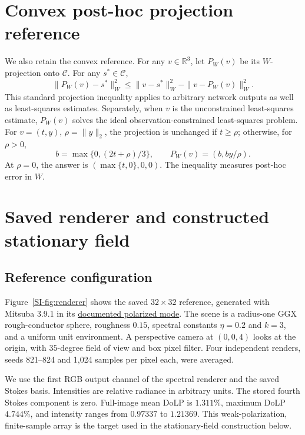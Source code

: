 \section{Convex post-hoc projection reference}
We also retain the convex reference. For any $v\in\mathbb R^3$, let $P_W(v)$ be its $W$-projection onto $\mathcal C$. For any $s^*\in\mathcal C$,
\begin{equation}
 \|P_W(v)-s^*\|_W^2\leq\|v-s^*\|_W^2-\|v-P_W(v)\|_W^2.
 \label{SI-eq:projbound}
\end{equation}
This standard projection inequality \cite{supp-prox} applies to arbitrary network outputs as well as least-squares estimates. Separately, when $v$ is the unconstrained least-squares estimate, $P_W(v)$ solves the ideal observation-constrained least-squares problem. For $v=(t,y)$, $\rho=\|y\|_2$, the projection is unchanged if $t\geq\rho$; otherwise, for $\rho>0$,
\begin{equation}
 b=\max\{0,(2t+\rho)/3\},\qquad P_W(v)=(b,by/\rho).
 \label{SI-eq:weightedprojection}
\end{equation}
At $\rho=0$, the answer is $(\max\{t,0\},0,0)$. The inequality measures post-hoc error in $W$.


\section{Saved renderer and constructed stationary field}
\subsection{Reference configuration}
Figure~\ref{SI-fig:renderer} shows the saved $32\times32$ reference, generated with Mitsuba 3.9.1 in its \href{https://mitsuba.readthedocs.io/en/latest/src/rendering/polarized_rendering.html}{documented polarized mode}. The scene is a radius-one GGX rough-conductor sphere, roughness $0.15$, spectral constants $\eta=0.2$ and $k=3$, and a uniform unit environment. A perspective camera at $(0,0,4)$ looks at the origin, with $35$-degree field of view and box pixel filter. Four independent renders, seeds 821--824 and 1,024 samples per pixel each, were averaged.

We use the first RGB output channel of the spectral renderer and the saved Stokes basis. Intensities are relative radiance in arbitrary units. The stored fourth Stokes component is zero. Full-image mean DoLP is $1.311\%$, maximum DoLP $4.744\%$, and intensity ranges from $0.97337$ to $1.21369$. This weak-polarization, finite-sample array is the target used in the stationary-field construction below.

